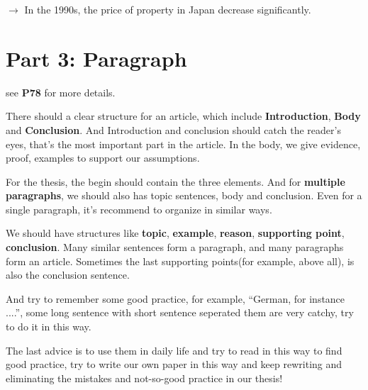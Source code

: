 \documentclass{article}
\begin{document}
$\rightarrow$ In the 1990s, the price of property in Japan decrease significantly.


\section{Part 3: Paragraph}

see \textbf{P78} for more details.

There should a clear structure for an article, which include \textbf{Introduction}, \textbf{Body} and \textbf{Conclusion}. And Introduction and conclusion should catch the reader's eyes, that's the most important part in the article. In the body, we give evidence, proof, examples to support our assumptions.

For the thesis, the begin should contain the three elements. And for \textbf{multiple paragraphs}, we should also has topic sentences, body and conclusion.  Even for a single paragraph, it's recommend to organize in similar ways.

We should have structures like \textbf{topic}, \textbf{example}, \textbf{reason}, \textbf{supporting point}, \textbf{conclusion}. Many similar sentences form a paragraph, and many paragraphs form an article. Sometimes the last supporting points(for example, above all), is also the conclusion sentence.

And try to remember some good practice, for example, ``German, for instance ....'', some long sentence with short sentence seperated them are very catchy, try to do it in this way.

The last advice is to use them in daily life and try to read in this way to find good practice, try to write our own paper in this way and keep rewriting and eliminating the mistakes and not-so-good practice in our thesis!
\end{document}
